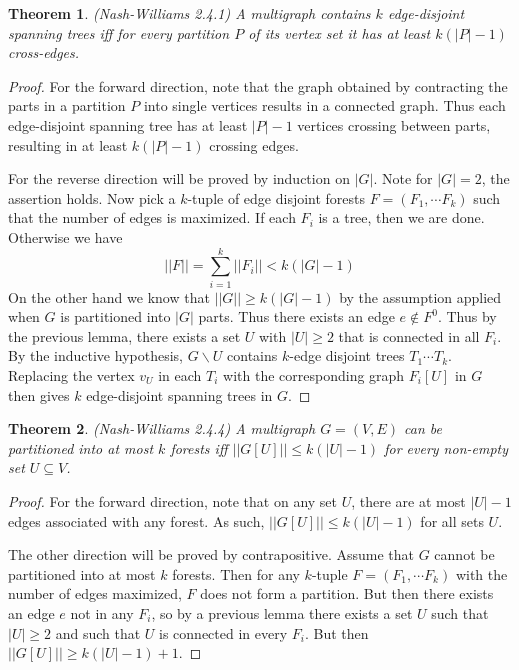 \documentclass[12pt]{article}
\newtheorem{theorem}{Theorem}
\begin{document}
\begin{theorem} (Nash-Williams 2.4.1) A multigraph contains $k$
  edge-disjoint spanning trees iff for every partition $P$ of its
  vertex set it has at least $k(|P|-1)$ cross-edges.
\end{theorem}
\begin{proof} For the forward direction, note that the graph obtained
  by contracting the parts in a partition $P$ into single vertices
  results in a connected graph. Thus each edge-disjoint spanning tree
  has at least $|P| - 1$ vertices crossing between parts, resulting in
  at least $k(|P| - 1)$ crossing edges.

  For the reverse direction will be proved by induction on $|G|$. Note
  for $|G| = 2$, the assertion holds. Now pick a $k$-tuple of edge
  disjoint forests $F = (F_{1},\cdots F_{k})$ such that the number of
  edges is maximized. If each $F_{i}$ is a tree, then we are
  done. Otherwise we have
  \[
    ||F|| = \sum_{i = 1}^k ||F_{i}|| < k(|G| - 1)
  \]
  On the other hand we know that $||G|| \geq k (|G| - 1)$ by the
  assumption applied when $G$ is partitioned into $|G|$ parts. Thus
  there exists an edge $e \notin F^0$. Thus by the previous lemma,
  there exists a set $U$ with $|U| \geq 2$ that is connected in all
  $F_i$. By the inductive hypothesis, $G\backslash U$ contains
  $k$-edge disjoint trees $T_1 \cdots T_k$. Replacing the vertex $v_U$
  in each $T_i$ with the corresponding graph $F_i[U]$ in $G$ then
  gives $k$ edge-disjoint spanning trees in $G$.
\end{proof}

\begin{theorem} (Nash-Williams 2.4.4) A multigraph $G = (V, E)$ can be
  partitioned into at most $k$ forests iff $||G[U]|| \leq k(|U| - 1)$
  for every non-empty set $U \subseteq V$.
\end{theorem}
\begin{proof} For the forward direction, note that on any set $U$,
  there are at most $|U| - 1$ edges associated with any forest. As
  such, $||G[U]|| \leq k (|U| - 1)$ for all sets $U$.

  The other direction will be proved by contrapositive. Assume that
  $G$ cannot be partitioned into at most $k$ forests. Then for any
  $k$-tuple $F = (F_1, \cdots F_k)$ with the number of edges
  maximized, $F$ does not form a partition. But then there exists an
  edge $e$ not in any $F_i$, so by a previous lemma there exists a set
  $U$ such that $|U| \geq 2$ and such that $U$ is connected in every
  $F_i$. But then $||G[U]|| \geq k(|U| - 1) + 1$.
\end{proof}
\end{document}
